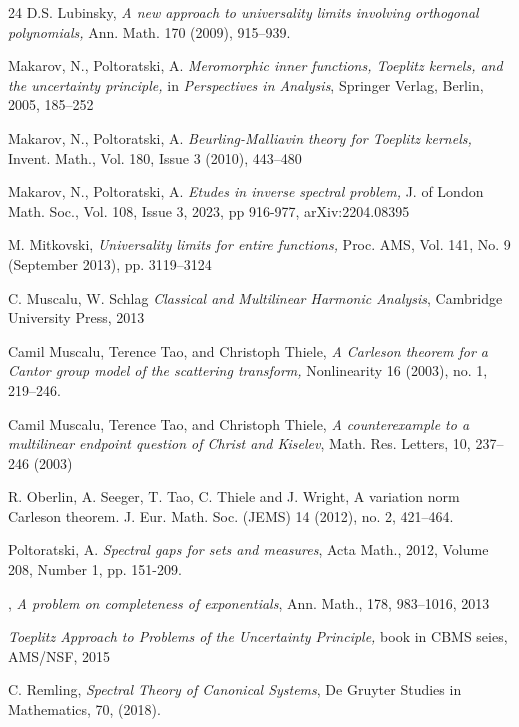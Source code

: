 \documentclass[11pt,twoside,reqno]{amsart}
\theoremstyle{plain}
\numberwithin{equation}{section}
\begin{document}
\begin{thebibliography}{24}
 {\sc D.S. Lubinsky,} {\it  A new approach to universality limits involving orthogonal polynomials,} Ann.
Math. 170 (2009), 915--939.


 {\sc  Makarov, N.,  Poltoratski, A.} {\it Meromorphic inner functions, Toeplitz kernels, and the uncertainty principle,} in {\it Perspectives in Analysis}, Springer Verlag, Berlin, 2005, 185--252

 {\sc  Makarov, N.,  Poltoratski, A.} {\it  Beurling-Malliavin theory for Toeplitz kernels,}
Invent. Math., Vol. 180, Issue 3 (2010), 443--480

 {\sc  Makarov, N.,  Poltoratski, A.} {\it Etudes in inverse spectral problem,}  J. of London Math. Soc., Vol. 108, Issue 3, 2023, pp 916-977, 
arXiv:2204.08395

 {\sc M. Mitkovski,} {\it Universality limits for entire functions,} Proc. AMS,
Vol. 141, No. 9 (September 2013), pp. 3119--3124


 {\sc C. Muscalu, W. Schlag} {\it
Classical and Multilinear Harmonic Analysis},
Cambridge University Press, 2013

 {\sc Camil Muscalu, Terence Tao, and Christoph Thiele,} {\it A Carleson theorem for a Cantor group model of the scattering transform, } Nonlinearity 16 (2003), no. 1, 219--246.

  {\sc Camil Muscalu, Terence Tao, and Christoph Thiele,}   {\it A counterexample to a multilinear endpoint question of Christ and Kiselev}, Math. Res. Letters, 10, 237--246 (2003)


 {\sc R. Oberlin, A. Seeger, T. Tao, C. Thiele and J. Wright,} A variation norm Carleson theorem. J. Eur. Math.
Soc. (JEMS) 14 (2012), no. 2, 421--464.


 {\sc Poltoratski, A.} {\it Spectral gaps for sets and measures}, Acta Math., 2012, Volume 208, Number 1, pp. 151-209.



,
{\it A problem on completeness of exponentials},
Ann. Math.,
178,
983--1016,
2013

 {\it Toeplitz Approach to Problems of the Uncertainty Principle,}	book in CBMS seies, AMS/NSF, 2015




 {\sc C. Remling,} {\it
Spectral Theory of Canonical Systems}, De Gruyter Studies in Mathematics, 70, (2018).


\end{thebibliography}
\end{document}
